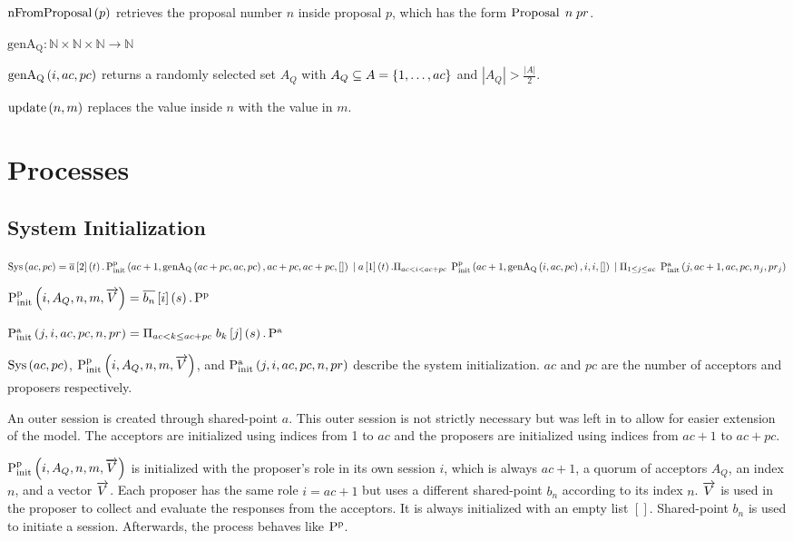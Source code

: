 $\operatorname{nFromProposal}\left(p \right)$ retrieves the proposal number $n$ inside proposal $p$, which has the form $\operatorname{Proposal}\; n\; pr$.

$\operatorname{genA_Q} : \mathbb{N} \times \mathbb{N} \times \mathbb{N} \to \mathbb{N}$

$\operatorname{genA_Q}\left(i, ac, pc\right)$ returns a randomly selected set $A_Q$ with $A_Q \subseteq A = \left\{1, \dots, ac\right\}$ and $|A_Q| > \frac{|A|}{2}$.

$\operatorname{update} \left(n, m\right)$ replaces the value inside $n$ with the value in $m$.

\section{Processes}
\subsection{System Initialization}
$\operatorname{Sys}\left(ac, pc\right) = \overline{a}\left[2\right]\left(t\right) . \operatorname{P^p_{init}}\left(ac + 1, \operatorname{genA_Q}\left(ac + pc, ac, pc\right), ac + pc, ac + pc, []\right)\\
\; | \; a\left[1\right]\left(t\right) . \Pi_{ac < i < ac + pc}\; \operatorname{P^p_{init}}\left(ac + 1, \operatorname{genA_Q}\left(i, ac, pc\right), i, i, []\right) \\
\; | \; \Pi_{1 \le j \le ac}\; \operatorname{P^a_{init}}\left(j, ac + 1, ac, pc, n_j, pr_j\right)$

$\operatorname{P^p_{init}}\left(i, A_Q, n, m, \overrightarrow{V}\right) = \overline{b_n}\left[i\right]\left(s\right) . \operatorname{P^p}$

$\operatorname{P^a_{init}}\left(j, i, ac, pc, n, pr\right) = \Pi_{ac < k \le ac + pc}\; b_k\left[j\right]\left(s\right) . \operatorname{P^a}$

$\operatorname{Sys}\left(ac, pc\right)$, $\operatorname{P^p_{init}}\left(i, A_Q, n, m, \overrightarrow{V}\right)$, and $\operatorname{P^a_{init}}\left(j, i, ac, pc, n, pr\right)$ describe the system initialization.
$ac$ and $pc$ are the number of acceptors and proposers respectively.

An outer session is created through shared-point $a$.
This outer session is not strictly necessary but was left in to allow for easier extension of the model.
The acceptors are initialized using indices from 1 to $ac$ and the proposers are initialized using indices from $ac + 1$ to $ac + pc$.

$\operatorname{P^p_{init}}\left(i, A_Q, n, m, \overrightarrow{V}\right)$ is initialized with the proposer's role in its own session $i$, which is always $ac + 1$, a quorum of acceptors $A_Q$, an index $n$, and a vector $\overrightarrow{V}$.
Each proposer has the same role $i = ac + 1$ but uses a different shared-point $b_n$ according to its index $n$.
$\overrightarrow{V}$ is used in the proposer to collect and evaluate the responses from the acceptors.
It is always initialized with an empty list $[]$.
Shared-point $b_n$ is used to initiate a session.
Afterwards, the process behaves like $\operatorname{P^p}$.

